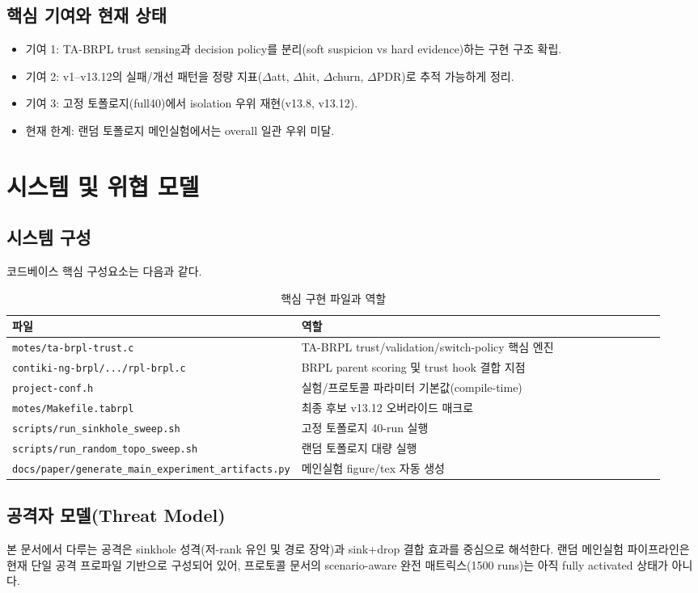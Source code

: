 \documentclass[11pt,a4paper]{report}
\begin{document}
\section{핵심 기여와 현재 상태}
\begin{itemize}
  \item 기여 1: TA-BRPL trust sensing과 decision policy를 분리(soft suspicion vs hard evidence)하는 구현 구조 확립.
  \item 기여 2: v1--v13.12의 실패/개선 패턴을 정량 지표($\Delta$att, $\Delta$hit, $\Delta$churn, $\Delta$PDR)로 추적 가능하게 정리.
  \item 기여 3: 고정 토폴로지(full40)에서 isolation 우위 재현(v13.8, v13.12).
  \item 현재 한계: 랜덤 토폴로지 메인실험에서는 overall 일관 우위 미달.
\end{itemize}

\chapter{시스템 및 위협 모델}
\section{시스템 구성}
코드베이스 핵심 구성요소는 다음과 같다.
\begin{table}[H]
\centering
\caption{핵심 구현 파일과 역할}
\begin{tabular}{p{0.34\linewidth}p{0.60\linewidth}}
\toprule
파일 & 역할 \\
\midrule
\texttt{motes/ta-brpl-trust.c} & TA-BRPL trust/validation/switch-policy 핵심 엔진 \\
\texttt{contiki-ng-brpl/.../rpl-brpl.c} & BRPL parent scoring 및 trust hook 결합 지점 \\
\texttt{project-conf.h} & 실험/프로토콜 파라미터 기본값(compile-time) \\
\texttt{motes/Makefile.tabrpl} & 최종 후보 v13.12 오버라이드 매크로 \\
\texttt{scripts/run\_sinkhole\_sweep.sh} & 고정 토폴로지 40-run 실행 \\
\texttt{scripts/run\_random\_topo\_sweep.sh} & 랜덤 토폴로지 대량 실행 \\
\texttt{docs/paper/generate\_main\_experiment\_artifacts.py} & 메인실험 figure/tex 자동 생성 \\
\bottomrule
\end{tabular}
\end{table}

\section{공격자 모델(Threat Model)}
본 문서에서 다루는 공격은 sinkhole 성격(저-rank 유인 및 경로 장악)과 sink+drop 결합 효과를 중심으로 해석한다.
랜덤 메인실험 파이프라인은 현재 단일 공격 프로파일 기반으로 구성되어 있어, 프로토콜 문서의 scenario-aware 완전 매트릭스(1500 runs)는 아직 fully activated 상태가 아니다.
\end{document}
